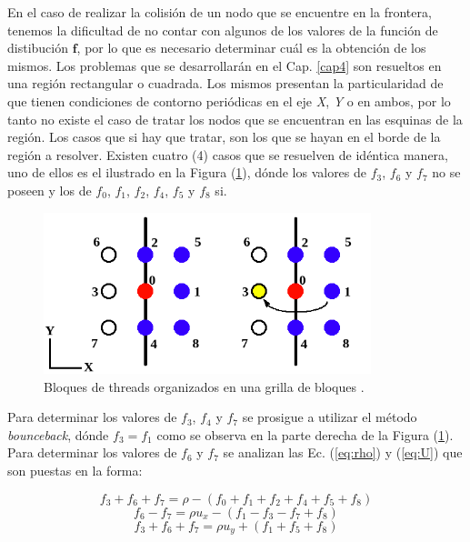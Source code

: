 En el caso de realizar la colisión de un nodo que se encuentre en la frontera, tenemos la dificultad de no contar con algunos de los valores de la función de distibución $\mathbf{f}$, por lo que es necesario determinar cuál es la obtención de los mismos.
Los problemas que se desarrollarán en el Cap. \ref{cap4} son resueltos en una región rectangular o cuadrada. Los mismos presentan la particularidad de que tienen condiciones de contorno periódicas en el eje \textit{X}, \textit{Y} o en ambos, por lo tanto no existe el caso de tratar los nodos que se encuentran en las esquinas de la región. Los casos que si hay que tratar, son los que se hayan en el borde de la región a resolver. Existen cuatro (4) casos que se resuelven de idéntica manera, uno de ellos es el ilustrado en la Figura (\ref{fig:CC_hidro}), dónde los valores de $f_{3}$, $f_{6}$ y $f_{7}$ no se poseen y los de $f_{0}$, $f_{1}$, $f_{2}$, $f_{4}$, $f_{5}$ y $f_{8}$ si.

\begin{figure}[h!]
	\centering
	\includegraphics[width=0.85\textwidth]{figs/cap2/CC_hidrodinamica.png}
	\caption{Bloques de threads organizados en una grilla de bloques \cite{rinaldi2011modelos}.}
	\label{fig:CC_hidro}
\end{figure}

Para determinar los valores de $f_{3}$, $f_{4}$ y $f_{7}$ se prosigue a utilizar el método \textit{bounceback}, dónde $f_{3} = f_{1}$ como se observa en la parte derecha de la Figura (\ref{fig:CC_hidro}). Para determinar los valores de $f_{6}$ y $f_{7}$ se analizan las Ec. (\ref{eq:rho}) y (\ref{eq:U}) que son puestas en la forma:

\begin{equation}
		f_{3} + f_{6} + f_{7} = \rho - \left( f_{0} + f_{1} + f_{2} + f_{4} + f_{5} + f_{8}	 \right)
\end{equation}
\begin{equation}
	f_{6} - f_{7} = \rho u_{x} - \left( f_{1} - f_{3} - f_{7} + f_{8} 	 \right)
\end{equation}
\begin{equation}
	f_{3} + f_{6} + f_{7} = \rho u_{y} + \left( f_{1} + f_{5} + f_{8} \right)
\end{equation}

